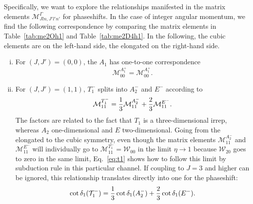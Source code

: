 \documentclass[aps,prd,reprint,showpacs,floatfix,longbibliography,,superscriptaddress]{revtex4-1}
\def\mw{\mathcal{W}}
\def\mm{\mathcal{M}}
\def\beq{\begin{equation}}
\def\eeq{\end{equation}}
\begin{document}
\begin{widetext}
Specifically, we want to explore the relationships manifested in the matrix elements  
$\mathcal{M}^\Gamma_{J ln , J' l'n' } $ for phaseshifts.
In the case of integer angular momentum, 
we find the following correspondence by comparing the matrix elements in Table~\ref{tab:me2Oh1} and  Table~\ref{tab:me2D4h1}.
In the following, the cubic elements are on the left-hand side, the elongated  on the right-hand side.
\begin{enumerate}[(i)]
\item
For $(J,J')=(0,0)$, the $A_1$ has  one-to-one correspondence  
\beq \mm^{A^+_1}_{00} = \mm^{A^+_1}_{00}. \eeq
\item
For $(J,J')=(1,1)$, $T^-_1$ splits into $A^-_2$ and  $E^-$ according to 
\beq \mm^{T^-_1}_{11} =  {1\over 3}  \mm^{A^-_2}_{11}  +  {2\over 3} \mm^{E^-}_{11}. \label{eq:t1} \eeq
The factors are related to the fact that
$T_1$ is a three-dimensional irrep, whereas $A_2$ one-dimensional and $E$ two-dimensional.
Going from the elongated to the cubic symmetry, even though the matrix elements $\mm^{A^-_2}_{11}$ and $\mm^{E^-}_{11}$ 
will individually go to $\mm^{T^-_1}_{11}=\mw_{00}$ in the limit $\eta\rightarrow 1$ because $\mw_{20}$ goes to zero in the same limit, Eq.~\ref{eq:t1} shows how to follow this limit by subduction rule  in this particular channel. If coupling to $J=3$ and higher can be ignored, this relationship translates directly into one for the phaseshift:
\beq \cot\delta_1(\mathcal{T}^-_1) =  {1\over 3} \cot\delta_1(A^-_2) +  {2\over 3} \cot\delta_1(E^-). \eeq


\end{enumerate}
\end{widetext}
\end{document}
